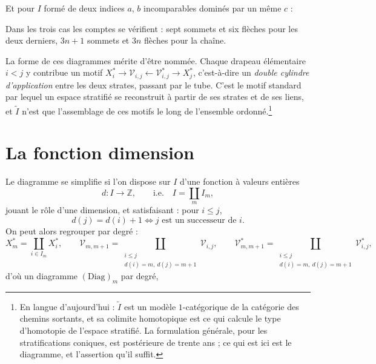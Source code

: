 \documentclass[11pt,a4paper]{article}
\begin{document}
Et pour $I$ formé de deux indices $a$, $b$ incomparables dominés par un même $c$ :


Dans les trois cas les comptes se vérifient : sept sommets et six flèches pour
les deux derniers, $3n+1$ sommets et $3n$ flèches pour la chaîne.

La forme de ces diagrammes mérite d'être nommée. Chaque drapeau élémentaire
$i < j$ y contribue un motif $X_{i}^{*} \to \mathcal{V}_{i,j} \leftarrow
\mathcal{V}^{*}_{i,j} \to X_{j}^{*}$, c'est-à-dire un \emph{double cylindre
d'application} entre les deux strates, passant par le tube. C'est le motif
standard par lequel un espace stratifié se reconstruit à partir de ses strates et
de ses liens, et $\widetilde{I}$ n'est que l'assemblage de ces motifs le long de
l'ensemble ordonné.\footnote{En langue d'aujourd'hui : $\widetilde{I}$ est un
modèle $1$-catégorique de la catégorie des chemins sortants, et sa colimite
homotopique est ce qui calcule le type d'homotopie de l'espace stratifié. La
formulation générale, pour les stratifications coniques, est postérieure de trente
ans ; ce qui est ici est le diagramme, et l'assertion qu'il suffit.}

\section*{La fonction dimension}

Le diagramme se simplifie si l'on dispose sur $I$ d'une fonction à valeurs
entières
\[
  d \colon I \longrightarrow \mathbb{Z},
  \qquad \text{i.e.} \quad I = \coprod_{m} I_{m},
\]
jouant le rôle d'une dimension, et satisfaisant : pour $i \leq j$,
\[
  d(j) = d(i) + 1 \iff j \text{ est un successeur de } i.
\]
On peut alors regrouper par degré :
\[
  X_{m}^{*} = \coprod_{i \in I_{m}} X_{i}^{*},
  \qquad
  \mathcal{V}_{m,m+1} = \coprod_{\substack{i \leq j \\ d(i)=m,\ d(j)=m+1}}
    \mathcal{V}_{i,j},
  \qquad
  \mathcal{V}^{*}_{m,m+1} = \coprod_{\substack{i \leq j \\ d(i)=m,\ d(j)=m+1}}
    \mathcal{V}^{*}_{i,j},
\]
d'où un diagramme $(\mathrm{Diag})_{m}$ par degré,
\end{document}
